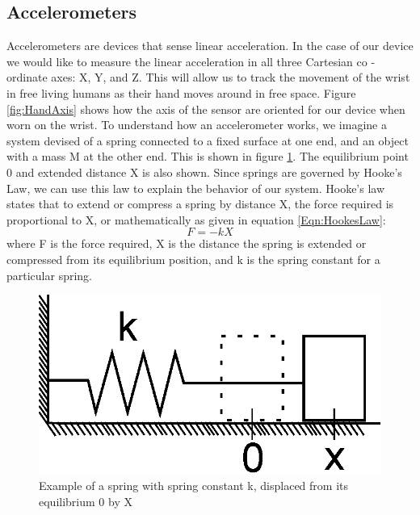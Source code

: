 \subsection{Accelerometers}
\label{Sec:Accelerometer}
Accelerometers are devices that sense linear acceleration.
In the case of our device we would like to measure the linear acceleration in all three Cartesian co - ordinate axes: X, Y, and Z.
This will allow us to track the movement of the wrist in free living humans as their hand moves around in free space.
Figure \ref{fig:HandAxis} shows how the axis of the sensor are oriented for our device when worn on the wrist.
To understand how an accelerometer works,
we imagine a system devised of a spring connected to a fixed surface at one end,
and an object with a mass M at the other end. This is shown in figure \ref{fig:HookeSpring}.
The equilibrium point 0 and extended distance X is also shown.
Since springs are governed by Hooke's Law, we can use this law to explain the behavior of our system.
Hooke's law states that to extend or compress a spring by distance X,
the force required is proportional to X, or mathematically as given in equation \ref{Eqn:HookesLaw}:
\begin{equation}
\label{Eqn:HookesLaw}
F = -kX 
\end{equation}
where F is the force required, X is the distance the spring is extended or compressed from its equilibrium position, and k is the spring constant for a particular spring.
\begin{figure}
\begin{center}
\includegraphics{images/HookesLaw.eps}
\caption{Example of a spring with spring constant k, displaced from its equilibrium 0 by X}
\label{fig:HookeSpring}
\end{center}
\end{figure}

